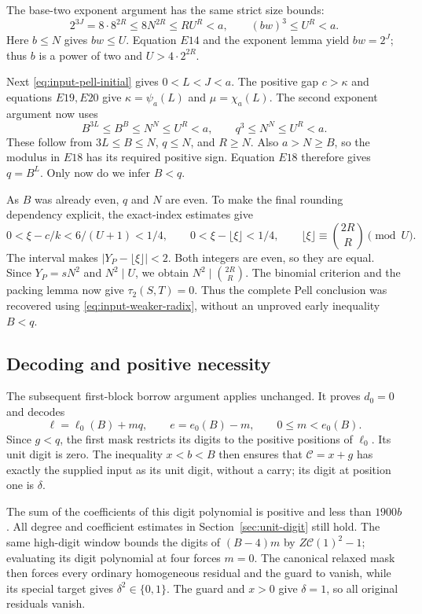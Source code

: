 The base-two exponent argument has the same strict size bounds:
\[
 2^{3J}=8\cdot8^{2R}\le8N^{2R}\le RU^R<a,
 \qquad (bw)^3\le U^R<a.
\]
Here $b\le N$ gives $bw\le U$.
Equation $E14$ and the exponent lemma yield $bw=2^J$;
thus $b$ is a power of two and $U>4\cdot2^{2R}$.

Next \eqref{eq:input-pell-initial} gives $0<L<J<a$.
The positive gap $c>\kappa$ and equations $E19,E20$ give
$\kappa=\psi_a(L)$ and $\mu=\chi_a(L)$. The second exponent
argument now uses
\begin{equation}\label{eq:input-exponent-bounds}
 B^{3L}\le B^B\le N^N\le U^R<a,
 \qquad q^3\le N^N\le U^R<a.
\end{equation}
These follow from $3L\le B\le N$, $q\le N$, and $R\ge N$.
Also $a>N\ge B$, so the modulus in $E18$ has its required
positive sign. Equation $E18$ therefore gives $q=B^L$.
Only now do we infer $B<q$.

As $B$ was already even, $q$ and $N$ are even. To make the final
rounding dependency explicit, the exact-index estimates give
\[
 0<\xi-c/k<6/(U+1)<1/4,
 \qquad 0<\xi-\lfloor\xi\rfloor<1/4,
 \qquad \lfloor\xi\rfloor\equiv\binom{2R}{R}\pmod U.
\]
The interval makes $|Y_P-\lfloor\xi\rfloor|<2$.
Both integers are even, so they are equal. Since $Y_P=sN^2$
and $N^2\mid U$, we obtain
$N^2\mid\binom{2R}{R}$. The binomial criterion and the packing
lemma now give $\tau_2(S,T)=0$. Thus the complete Pell conclusion
was recovered using \eqref{eq:input-weaker-radix}, without an
unproved early inequality $B<q$.

\subsection{Decoding and positive necessity}

The subsequent first-block borrow argument applies unchanged.
It proves $d_0=0$ and decodes
\[
 \ell=\ell_0(B)+mq,\qquad e=e_0(B)-m,
 \qquad 0\le m<e_0(B).
\]
Since $g<q$, the first mask restricts its digits to the positive
positions of $\ell_0$. Its unit digit is zero. The inequality
$x<b<B$ then ensures that $\mathcal C=x+g$ has exactly the supplied
input as its unit digit, without a carry; its digit at position one
is $\delta$.

The sum of the coefficients of this digit polynomial is positive
and less than $1900b$. All degree and coefficient estimates in
Section~\ref{sec:unit-digit} still hold. The same high-digit window
bounds the digits of $(B-4)m$ by $Z\mathcal C(1)^2-1$; evaluating
its digit polynomial at four forces $m=0$. The canonical relaxed
mask then forces every ordinary homogeneous residual and the guard
to vanish, while its special target gives $\delta^2\in\{0,1\}$.
The guard and $x>0$ give $\delta=1$, so all original residuals vanish.

